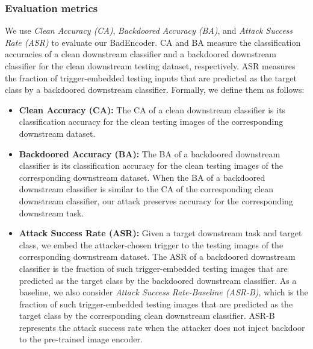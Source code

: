 \subsubsection{Evaluation metrics} We use \emph{Clean Accuracy (CA)}, \emph{ Backdoored Accuracy (BA)}, and \emph{Attack Success Rate (ASR)} to evaluate our BadEncoder. CA and  BA measure the classification accuracies of a clean downstream classifier and a backdoored downstream classifier for the clean downstream testing dataset, respectively. 
ASR measures the fraction of trigger-embedded testing inputs that are predicted as the target class by a backdoored downstream classifier. Formally, we define them as follows: 






\begin{itemize}


     
    \item {\bf Clean Accuracy (CA):} The CA of a clean downstream classifier is its classification accuracy for the clean testing images of the corresponding downstream dataset. 
    

    
    \item {\bf  Backdoored Accuracy (BA):}  The BA of a backdoored downstream classifier is its classification accuracy for the clean testing images of the corresponding downstream dataset. 
    When the BA of a backdoored downstream classifier is similar to the CA of the corresponding clean downstream classifier, our attack preserves accuracy for the corresponding downstream task. 


    \item {\bf Attack Success Rate (ASR):} Given a target downstream task and target class, we embed the attacker-chosen trigger to the testing images of the corresponding downstream dataset. The ASR of a backdoored downstream classifier is the fraction of such trigger-embedded testing images that are predicted as the target class by the backdoored downstream classifier. As a baseline,  we also consider \emph{Attack Success Rate-Baseline (ASR-B)}, which is the fraction of such trigger-embedded testing images that are predicted as the target class by the corresponding clean downstream classifier. ASR-B represents the attack success rate when the attacker does not inject backdoor to the pre-trained image encoder. 
    
\end{itemize}









